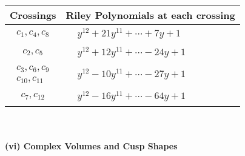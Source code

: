 \documentclass[1p]{elsarticle_modified}
\theoremstyle{definition}
\begin{document}
\begin{tabular}{m{50pt}|m{274pt}}
Crossings & \hspace{64pt}Riley Polynomials at each crossing \\
\hline $$\begin{aligned}c_{1},c_{4},c_{8}\end{aligned}$$&$\begin{aligned}
&y^{12}+21 y^{11}+\cdots+7 y+1
\end{aligned}$\\
\hline $$\begin{aligned}c_{2},c_{5}\end{aligned}$$&$\begin{aligned}
&y^{12}+12 y^{11}+\cdots-24 y+1
\end{aligned}$\\
\hline $$\begin{aligned}c_{3},c_{6},c_{9}\\c_{10},c_{11}\end{aligned}$$&$\begin{aligned}
&y^{12}-10 y^{11}+\cdots-27 y+1
\end{aligned}$\\
\hline $$\begin{aligned}c_{7},c_{12}\end{aligned}$$&$\begin{aligned}
&y^{12}-16 y^{11}+\cdots-64 y+1
\end{aligned}$\\
\hline
\end{tabular}\\~\\
\newpage\flushleft \textbf{(vi) Complex Volumes and Cusp Shapes}
\end{document}
